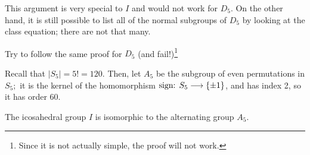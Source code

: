 This argument is very special to $I$ and would not work for $D_5.$ On the other hand, it is still possible to list all of the normal subgroups of $D_5$ by looking at the class equation; there are not that many.

\begin{problem}
Try to follow the same proof for $D_5$ (and fail!)\footnote{Since it is not actually simple, the proof will not work.}
\end{problem}

Recall that $|S_5| = 5! = 120.$ Then, let $A_5$ be the subgroup of even permutations in $S_5;$ it is the kernel of the homomorphism  $\text{sign: } S_5 \longrightarrow \{\pm 1\}$, and has index 2, so it has order 60. 

\begin{theorem}
The icosahedral group $I$ is isomorphic to the alternating group $A_5.$ 
\end{theorem}

